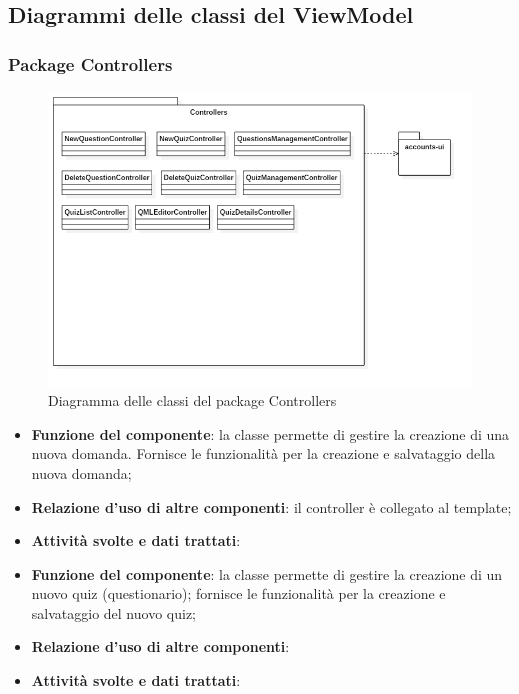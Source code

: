 \subsection{Diagrammi delle classi del ViewModel}
\subsubsection{Package Controllers}
\begin{figure}[h!]
	\begin{center}
		\includegraphics[scale=0.6]{../images/ControllersClass.png}
		\caption{Diagramma delle classi del package Controllers}
	\end{center}
\end{figure}


\begin{itemize}
	\item\textbf{Funzione del componente}: la classe permette di gestire la creazione di una nuova domanda. Fornisce le funzionalità per la creazione e salvataggio della nuova domanda;
	\item\textbf{Relazione d'uso di altre componenti}: il controller è collegato al template;
	\item\textbf{Attività svolte e dati trattati}: 
\end{itemize}


\begin{itemize}
	\item\textbf{Funzione del componente}: la classe permette di gestire la creazione di un nuovo quiz (questionario); fornisce le funzionalità per la creazione e salvataggio del nuovo quiz;
	\item\textbf{Relazione d'uso di altre componenti}:
	\item\textbf{Attività svolte e dati trattati}:
\end{itemize}

